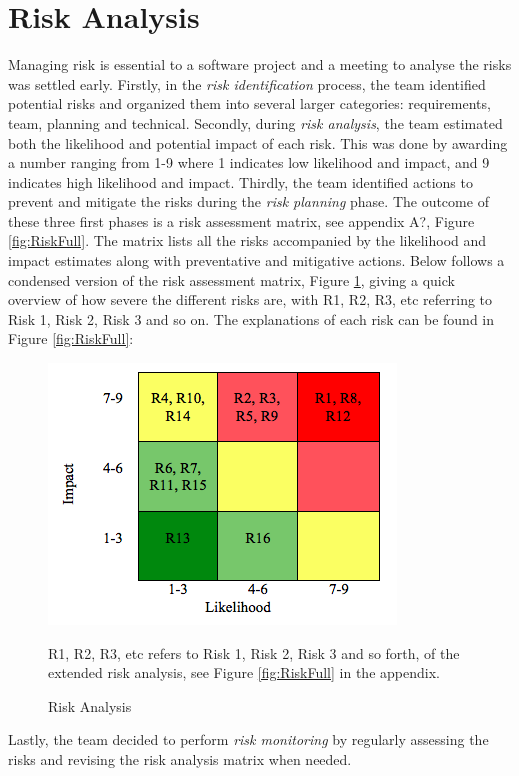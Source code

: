 \section{Risk Analysis}
Managing risk is essential to a software project and a meeting to analyse the risks was settled early. Firstly, in the \textit{risk identification} process, the team identified potential risks and organized them into several larger categories: requirements, team, planning and technical. Secondly, during \textit{risk analysis}, the team estimated both the likelihood and potential impact of each risk. This was done by awarding a number ranging from 1-9 where 1 indicates low likelihood and impact, and 9 indicates high likelihood and impact. Thirdly, the team identified actions to prevent and mitigate the risks during the \textit{risk planning} phase. The outcome of these three first phases is a risk assessment matrix, see appendix A?, Figure \ref{fig:RiskFull}. The matrix lists all the risks accompanied by the likelihood and impact estimates along with preventative and mitigative actions. Below follows a condensed version of the risk assessment matrix, Figure \ref{fig:Risk}, giving a quick overview of how severe the different risks are, with R1, R2, R3, etc referring to Risk 1, Risk 2, Risk 3 and so on. The explanations of each risk can be found in Figure \ref{fig:RiskFull}: 
\begin{figure}[h!]
\centering
\includegraphics[scale=0.8]{Figures/RiskAnalysis.png}
\caption{Risk Analysis}
\label{fig:Risk}
\medskip
\small
R1, R2, R3, etc refers to Risk 1, Risk 2, Risk 3 and so forth, of the extended risk analysis, see Figure \ref{fig:RiskFull} in the appendix.
\end{figure}

Lastly,  the team decided to perform \textit{risk monitoring} by regularly assessing the risks and revising the risk analysis matrix when needed. 


